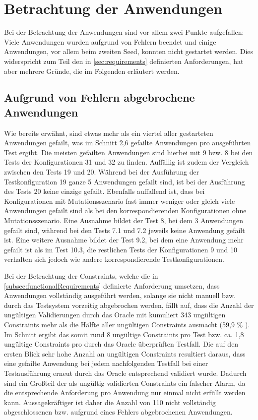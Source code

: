\section{Betrachtung der Anwendungen}
\label{sec:appEval}

Bei der Betrachtung der Anwendungen sind vor allem zwei Punkte aufgefallen:
Viele Anwendungen wurden aufgrund von Fehlern beendet und einige Anwendungen, vor allem beim zweiten Seed, konnten nicht gestartet werden.
Dies widerspricht zum Teil den in \autoref{sec:requirements} definierten Anforderungen, hat aber mehrere Gründe, die im Folgenden erläutert werden.

\subsection{Aufgrund von Fehlern abgebrochene Anwendungen}
\label{subsec:failedApps}

Wie bereits erwähnt, sind etwas mehr als ein viertel aller gestarteten Anwendungen gefailt, was im Schnitt 2,6 gefailte Anwendungen pro ausgeführten Test ergibt.
Die meisten gefailten Anwendungen sind hierbei mit 9 bzw. 8 bei den Tests der Konfigurationen 31 und 32 zu finden.
Auffällig ist zudem der Vergleich zwischen den Tests 19 und 20.
Während bei der Ausführung der Testkonfiguration 19 ganze 5 Anwendungen gefailt sind, ist bei der Ausführung des Tests 20 keine einzige gefailt.
Ebenfalls auffallend ist, dass bei Konfigurationen mit Mutationsszenario fast immer weniger oder gleich viele Anwendungen gefailt sind als bei den korrespondierenden Konfigurationen ohne Mutationsszenario.
Eine Ausnahme bildet der Test 8, bei dem 3 Anwendungen gefailt sind, während bei den Tests 7.1 und 7.2 jeweils keine Anwendung gefailt ist.
Eine weitere Ausnahme bildet der Test 9.2, bei dem eine Anwendung mehr gefailt ist als im Test 10.3, die restlichen Tests der Konfigurationen 9 und 10 verhalten sich jedoch wie andere korrespondierende Testkonfigurationen.

Bei der Betrachtung der Constraints, welche die in \autoref{subsec:functionalRequirements} definierte Anforderung umsetzen, dass Anwendungen vollständig ausgeführt werden, solange sie nicht manuell bzw. durch das Testsystem vorzeitig abgebrochen werden, fällt auf, dass die Anzahl der ungültigen Validierungen durch das Oracle mit kumuliert 343 ungültigen Constraints mehr als die Hälfte aller ungültigen Constraints ausmacht (59,9 \% ).
Im Schnitt ergibt das somit rund 8 ungültige Constraints pro Test bzw. ca. 1,8 ungültige Constraints pro durch das Oracle überprüften Testfall.
Die auf den ersten Blick sehr hohe Anzahl an ungültigen Constraints resultiert daraus, dass eine gefailte Anwendung bei jedem nachfolgenden Testfall bei einer Testausführung erneut durch das Oracle entsprechend validiert wurde.
Dadurch sind ein Großteil der als ungültig validierten Constraints ein falscher Alarm, da die entsprechende Anforderung pro Anwendung nur einmal nicht erfüllt werden kann.
Aussagekräftiger ist daher die Anzahl von 110 nicht vollständig abgeschlossenen bzw. aufgrund eines Fehlers abgebrochenen Anwendungen.

